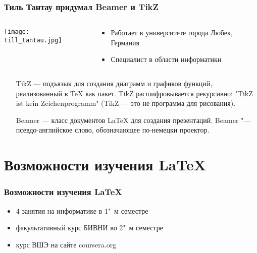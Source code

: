 \documentclass[10pt,pdf,hyperref={unicode}]{beamer}
\begin{document}
\begin{frame}
    \frametitle{Тиль Тантау придумал Beamer и TikZ}
    \begin{columns}[c]
        \begin{column}{0.5\textwidth}
            \texttt{[image: till\_tantau.jpg]}
        \end{column}
        \begin{column}{0.5\textwidth}
            \begin{itemize}
                \item Работает в университете города Любек, Германия
                \item Специалист в области информатики  
            \end{itemize}
        \end{column}
    \end{columns}
    \vfill
    \begin{itemize}
        \item[TikZ] --- подъязык для создания диаграмм и графиков функций, реализованный в \TeX{} как пакет. TikZ расшифровывается рекурсивно: "TikZ ist kein Zeichenprogramm"  (TikZ --- это не программа для рисования).
        \item[Beamer] --- класс документов \LaTeX{} для создания презентаций. Beamer "--- псевдо-английское слово, обозначающее по-немецки проектор. 
    \end{itemize}    
\end{frame}
\section{Возможности изучения \LaTeX}
\begin{frame}
    \frametitle{Возможности изучения \LaTeX}
    
    \begin{itemize}
        \item 4 занятия на информатике в 1"~м семестре 
        \item факультативный курс БИВНИ во 2"~м семестре
        \item курс ВШЭ на сайте coursera.org
        \end{itemize}
\end{frame}
\end{document}
